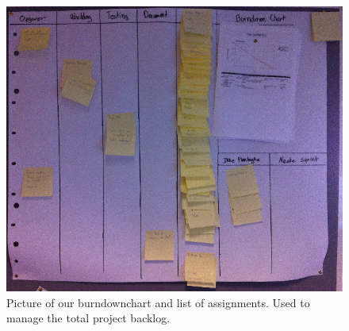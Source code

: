 	\begin{figure}[H]
		\centering
			\includegraphics[width=\textwidth]{Images/burndown.png}
				\caption{Picture of our burndownchart and list of assignments. Used to manage the total project backlog.}
		\label{fig:burn}
	\end{figure}
	
